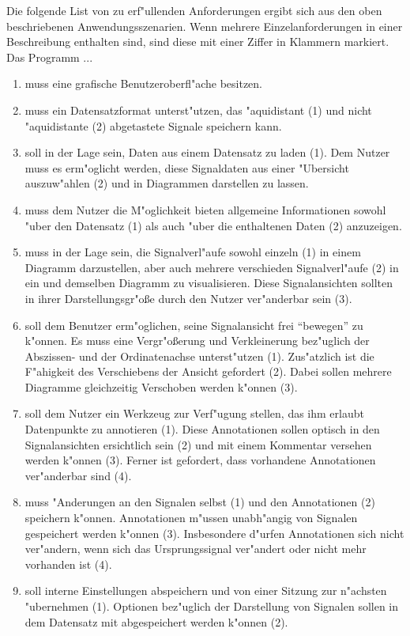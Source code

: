 Die folgende List von zu erf"ullenden Anforderungen ergibt sich aus den oben beschriebenen Anwendungsszenarien.
Wenn mehrere Einzelanforderungen in einer Beschreibung enthalten sind, sind diese mit einer Ziffer in Klammern markiert.
Das Programm ...
\renewcommand{\theenumi}{\Alph{enumi}}
\renewcommand{\labelenumi}{\theenumi )}
\newcommand{\AF}[1]{\item \label{AF:#1}}
\begin{enumerate}
	\AF{gui} muss eine grafische Benutzeroberfl"ache besitzen.
	\AF{datensatz} muss ein Datensatzformat unterst"utzen, das "aquidistant (1) und nicht "aquidistante (2) abgetastete Signale speichern kann.
	\AF{datenmanagement} soll in der Lage sein, Daten aus einem Datensatz zu laden (1).
						 Dem Nutzer muss es erm"oglicht werden, diese Signaldaten aus einer "Ubersicht auszuw"ahlen (2) und in Diagrammen darstellen zu lassen.
	\AF{dateninformation} muss dem Nutzer die M"oglichkeit bieten allgemeine Informationen sowohl "uber den Datensatz (1) als auch "uber die enthaltenen Daten (2) anzuzeigen.
	\AF{diagramm} muss in der Lage sein, die Signalverl"aufe sowohl einzeln (1) in einem Diagramm darzustellen, aber auch mehrere verschieden Signalverl"aufe (2) in ein und demselben Diagramm zu visualisieren.
				  Diese Signalansichten sollten in ihrer Darstellungsgr"o\ss e durch den Nutzer ver"anderbar sein (3).
	\AF{ansicht} soll dem Benutzer erm"oglichen, seine Signalansicht frei "`bewegen"' zu k"onnen.
				 Es muss eine Vergr"o\ss erung und Verkleinerung bez"uglich der Abszissen- und der Ordinatenachse unterst"utzen (1).
				 Zus"atzlich ist die F"ahigkeit des Verschiebens der Ansicht gefordert (2).
				 Dabei sollen mehrere Diagramme gleichzeitig Verschoben werden k"onnen (3).
	\AF{annotationen} soll dem Nutzer ein Werkzeug zur Verf"ugung stellen, das ihm erlaubt Datenpunkte zu annotieren (1).
					  Diese Annotationen sollen optisch in den Signalansichten ersichtlich sein (2) und mit einem Kommentar versehen werden k"onnen (3).
				  	  Ferner ist gefordert, dass vorhandene Annotationen ver"anderbar sind (4).
	\AF{io} muss "Anderungen an den Signalen selbst (1) und den Annotationen (2) speichern k"onnen.
			Annotationen m"ussen unabh"angig von Signalen gespeichert werden k"onnen (3).
			Insbesondere d"urfen Annotationen sich nicht ver"andern, wenn sich das Ursprungssignal ver"andert oder nicht mehr vorhanden ist (4).
	\AF{einstellungen} soll interne Einstellungen abspeichern und von einer Sitzung zur n"achsten "ubernehmen (1).
					   Optionen bez"uglich der Darstellung von Signalen sollen in dem Datensatz mit abgespeichert werden k"onnen (2).
\end{enumerate}


